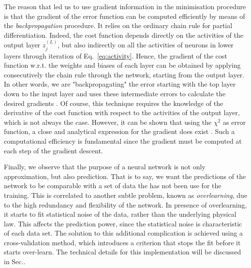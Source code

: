 The reason that led us to use gradient information in the minimisation procedure is that the gradient of the error function can be computed efficiently by means of the \textit{backpropagation} procedure. It relies on the ordinary chain rule for partial differentiation. Indeed, the cost function depends directly on the activities of the output layer $z_j^{(L)}$, but also indirectly on all the activities of neurons in lower layers through iteration of Eq.~\eqref{eq:activity}. Hence, the gradient of the cost function w.r.t. the weights and biases of each layer can be obtained by applying consecutively the chain rule through the network, starting from the output layer. In other words, we are "backpropagating" the error starting with the top layer down to the input layer and uses these intermediate errors to calculate the desired gradients \cite{HBLV}. Of course, this technique requires the knowledge of the derivative of the cost function with respect to the activities of the output layer, which is not always the case. However, it can be shown that using the $\chi^2$ as error function, a close and analytical expression for the gradient does exist \cite{AbdulKhalek:2020uza}. Such a computational efficiency is fundamental since the gradient must be computed at each step of the gradient descent.\par
Finally, we observe that the purpose of a neural network is not only approximation, but also prediction. That is to say, we want the predictions of the network to be comparable with a set of data the has not been use for the training. This is correlated to another subtle problem, known as \textit{overlearning}, due to the high redundancy and flexibility of the network. In presence of overlearning, it starts to fit statistical noise of the data, rather than the underlying physical law. This affects the prediction power, since the statistical noise is characteristic of each data set. The solution to this additional complication is achieved using a cross-validation method, which introduces a criterion that stops the fit before it starts over-learn. The technical details for this implementation will be discussed in Sec..


